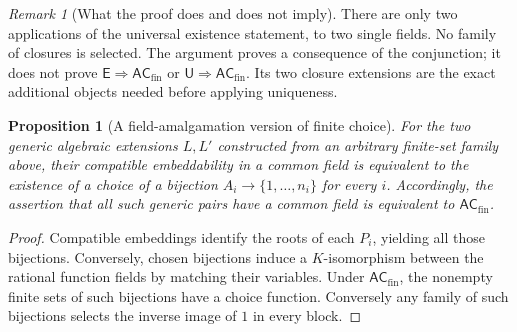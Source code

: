 \documentclass[11pt,a4paper]{article}
\newtheorem{proposition}[theorem]{Proposition}
\theoremstyle{definition}\newtheorem{definition}[theorem]{Definition}
\theoremstyle{remark}\newtheorem{remark}[theorem]{Remark}
\newcommand{\E}{\mathsf E}\newcommand{\U}{\mathsf U}
\newcommand{\ACfin}{\mathsf{AC}_{\mathrm{fin}}}
\begin{document}
\begin{remark}[What the proof does and does not imply]
There are only two applications of the universal existence statement, to two single fields. No family of closures is selected. The argument proves a consequence of the conjunction; it does not prove $\E\Rightarrow\ACfin$ or $\U\Rightarrow\ACfin$. Its two closure extensions are the exact additional objects needed before applying uniqueness.
\end{remark}

\begin{proposition}[A field-amalgamation version of finite choice]\label{prop:generic}
For the two generic algebraic extensions $L,L'$ constructed from an arbitrary finite-set family above, their compatible embeddability in a common field is equivalent to the existence of a choice of a bijection $A_i\to\{1,\ldots,n_i\}$ for every $i$. Accordingly, the assertion that all such generic pairs have a common field is equivalent to $\ACfin$.
\end{proposition}
\begin{proof}
Compatible embeddings identify the roots of each $P_i$, yielding all those bijections. Conversely, chosen bijections induce a $K$-isomorphism between the rational function fields by matching their variables. Under $\ACfin$, the nonempty finite sets of such bijections have a choice function. Conversely any family of such bijections selects the inverse image of $1$ in every block.
\end{proof}
\end{document}
